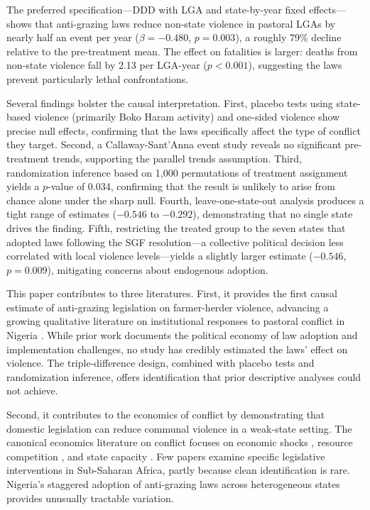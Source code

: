 \documentclass[12pt]{article}
\begin{document}
The preferred specification---DDD with LGA and state-by-year fixed effects---shows that anti-grazing laws reduce non-state violence in pastoral LGAs by nearly half an event per year ($\beta = -0.480$, $p = 0.003$), a roughly 79\% decline relative to the pre-treatment mean. The effect on fatalities is larger: deaths from non-state violence fall by 2.13 per LGA-year ($p < 0.001$), suggesting the laws prevent particularly lethal confrontations.

Several findings bolster the causal interpretation. First, placebo tests using state-based violence (primarily Boko Haram activity) and one-sided violence show precise null effects, confirming that the laws specifically affect the type of conflict they target. Second, a Callaway-Sant'Anna event study reveals no significant pre-treatment trends, supporting the parallel trends assumption. Third, randomization inference based on 1,000 permutations of treatment assignment yields a $p$-value of 0.034, confirming that the result is unlikely to arise from chance alone under the sharp null. Fourth, leave-one-state-out analysis produces a tight range of estimates ($-0.546$ to $-0.292$), demonstrating that no single state drives the finding. Fifth, restricting the treated group to the seven states that adopted laws following the SGF resolution---a collective political decision less correlated with local violence levels---yields a slightly larger estimate ($-0.546$, $p = 0.009$), mitigating concerns about endogenous adoption.

This paper contributes to three literatures. First, it provides the first causal estimate of anti-grazing legislation on farmer-herder violence, advancing a growing qualitative literature on institutional responses to pastoral conflict in Nigeria \citep{ajala2020anti, ochonu2022anti, akinyetun2021institutional}. While prior work documents the political economy of law adoption and implementation challenges, no study has credibly estimated the laws' effect on violence. The triple-difference design, combined with placebo tests and randomization inference, offers identification that prior descriptive analyses could not achieve.

Second, it contributes to the economics of conflict by demonstrating that domestic legislation can reduce communal violence in a weak-state setting. The canonical economics literature on conflict focuses on economic shocks \citep{miguel2004economic, dube2013commodity, bazzi2014economic}, resource competition \citep{hsiang2013quantifying, burke2015climate}, and state capacity \citep{besley2011pillars, dell2018nation}. Few papers examine specific legislative interventions in Sub-Saharan Africa, partly because clean identification is rare. Nigeria's staggered adoption of anti-grazing laws across heterogeneous states provides unusually tractable variation.
\end{document}
